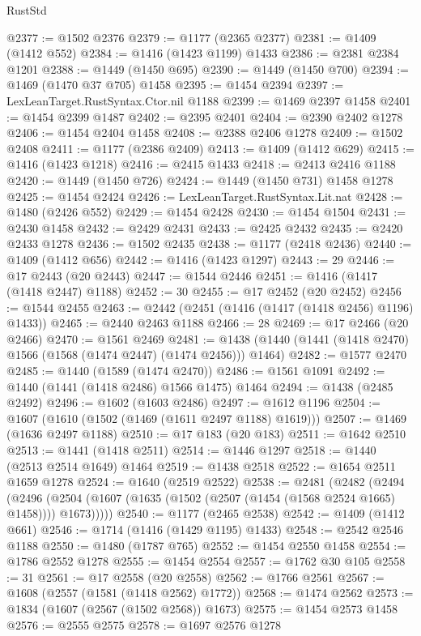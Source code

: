 \begin{lexlean}{RustStd}
\begin{coremodule}
@2377 := @1502 @2376
@2379 := @1177 (@2365 @2377)
@2381 := @1409 (@1412 @552)
@2384 := @1416 (@1423 @1199) @1433
@2386 := @2381 @2384 @1201
@2388 := @1449 (@1450 @695)
@2390 := @1449 (@1450 @700)
@2394 := @1469 (@1470 @37 @705) @1458
@2395 := @1454 @2394
@2397 := LexLeanTarget.RustSyntax.Ctor.nil @1188
@2399 := @1469 @2397 @1458
@2401 := @1454 @2399 @1487
@2402 := @2395 @2401
@2404 := @2390 @2402 @1278
@2406 := @1454 @2404 @1458
@2408 := @2388 @2406 @1278
@2409 := @1502 @2408
@2411 := @1177 (@2386 @2409)
@2413 := @1409 (@1412 @629)
@2415 := @1416 (@1423 @1218)
@2416 := @2415 @1433
@2418 := @2413 @2416 @1188
@2420 := @1449 (@1450 @726)
@2424 := @1449 (@1450 @731) @1458 @1278
@2425 := @1454 @2424
@2426 := LexLeanTarget.RustSyntax.Lit.nat
@2428 := @1480 (@2426 @552)
@2429 := @1454 @2428
@2430 := @1454 @1504
@2431 := @2430 @1458
@2432 := @2429 @2431
@2433 := @2425 @2432
@2435 := @2420 @2433 @1278
@2436 := @1502 @2435
@2438 := @1177 (@2418 @2436)
@2440 := @1409 (@1412 @656)
@2442 := @1416 (@1423 @1297)
@2443 := 29
@2446 := @17 @2443 (@20 @2443)
@2447 := @1544 @2446
@2451 := @1416 (@1417 (@1418 @2447) @1188)
@2452 := 30
@2455 := @17 @2452 (@20 @2452)
@2456 := @1544 @2455
@2463 := @2442 (@2451 (@1416 (@1417 (@1418 @2456) @1196) @1433))
@2465 := @2440 @2463 @1188
@2466 := 28
@2469 := @17 @2466 (@20 @2466)
@2470 := @1561 @2469
@2481 := @1438 (@1440 (@1441 (@1418 @2470) @1566 (@1568 (@1474 @2447) (@1474 @2456))) @1464)
@2482 := @1577 @2470
@2485 := @1440 (@1589 (@1474 @2470))
@2486 := @1561 @1091
@2492 := @1440 (@1441 (@1418 @2486) @1566 @1475) @1464
@2494 := @1438 (@2485 @2492)
@2496 := @1602 (@1603 @2486)
@2497 := @1612 @1196
@2504 := @1607 (@1610 (@1502 (@1469 (@1611 @2497 @1188) @1619)))
@2507 := @1469 (@1636 @2497 @1188)
@2510 := @17 @183 (@20 @183)
@2511 := @1642 @2510
@2513 := @1441 (@1418 @2511)
@2514 := @1446 @1297
@2518 := @1440 (@2513 @2514 @1649) @1464
@2519 := @1438 @2518
@2522 := @1654 @2511 @1659 @1278
@2524 := @1640 (@2519 @2522)
@2538 := @2481
    (@2482
      (@2494
        (@2496 (@2504 (@1607 (@1635 (@1502 (@2507 (@1454 (@1568 @2524 @1665) @1458)))) @1673)))))
@2540 := @1177 (@2465 @2538)
@2542 := @1409 (@1412 @661)
@2546 := @1714 (@1416 (@1429 @1195) @1433)
@2548 := @2542 @2546 @1188
@2550 := @1480 (@1787 @765)
@2552 := @1454 @2550 @1458
@2554 := @1786 @2552 @1278
@2555 := @1454 @2554
@2557 := @1762 @30 @105
@2558 := 31
@2561 := @17 @2558 (@20 @2558)
@2562 := @1766 @2561
@2567 := @1608 (@2557 (@1581 (@1418 @2562) @1772))
@2568 := @1474 @2562
@2573 := @1834 (@1607 (@2567 (@1502 @2568)) @1673)
@2575 := @1454 @2573 @1458
@2576 := @2555 @2575
@2578 := @1697 @2576 @1278

\end{coremodule}
\end{lexlean}
